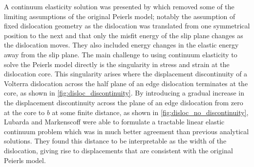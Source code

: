 A continuum elasticity solution was presented by \citet{Lubarda2007} which removed some of the limiting assumptions of the original Peierls model; notably the assumption of fixed dislocation geometry as the dislocation was translated from one symmetrical position to the next and that only the misfit energy of the slip plane changes as the dislocation moves. They also included energy changes in the elastic energy away from the slip plane. The main challenge to using continuum elasticity to solve the Peierls model directly is the singularity in stress and strain at the dislocation core. This singularity arises where the displacement discontinuity of a Volterra dislocation across the half plane of an edge dislocation terminates at the core, as shown in \autoref{fig:disloc_discontinuity}. By introducing a gradual increase in the displacement discontinuity across the plane of an edge dislocation from zero at the core to $b$ at some finite distance, as shown in \ref{fig:disloc_no_discontinuity}, Lubarda and Markenscoff were able to formulate a tractable linear elastic continuum problem which was in much better agreement than previous analytical solutions. They found this distance to be interpretable as the width of the dislocation, giving rise to displacements that are consistent with the original Peierls model. 



